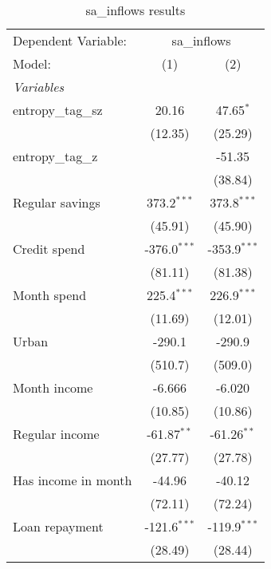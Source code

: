 
\begin{table}[htbp]
   \centering
   \footnotesize
   \begin{threeparttable}[b]
      \caption{\label{tab:reg_sa_inflows_full.tex} sa\_inflows results}
      \begin{tabular}{lcc}
         \tabularnewline \midrule \midrule
         Dependent Variable: & \multicolumn{2}{c}{sa\_inflows}\\
         Model:              & (1)            & (2)\\  
         \midrule
         \emph{Variables}\\
         entropy\_tag\_sz    & 20.16          & 47.65$^{*}$\\   
                             & (12.35)        & (25.29)\\   
         entropy\_tag\_z     &                & -51.35\\   
                             &                & (38.84)\\   
         Regular savings     & 373.2$^{***}$  & 373.8$^{***}$\\   
                             & (45.91)        & (45.90)\\   
         Credit spend        & -376.0$^{***}$ & -353.9$^{***}$\\   
                             & (81.11)        & (81.38)\\   
         Month spend         & 225.4$^{***}$  & 226.9$^{***}$\\   
                             & (11.69)        & (12.01)\\   
         Urban               & -290.1         & -290.9\\   
                             & (510.7)        & (509.0)\\   
         Month income        & -6.666         & -6.020\\   
                             & (10.85)        & (10.86)\\   
         Regular income      & -61.87$^{**}$  & -61.26$^{**}$\\   
                             & (27.77)        & (27.78)\\   
         Has income in month & -44.96         & -40.12\\   
                             & (72.11)        & (72.24)\\   
         Loan repayment      & -121.6$^{***}$ & -119.9$^{***}$\\   
                             & (28.49)        & (28.44)\\   

\end{tabular}
\end{threeparttable}
\end{table}
